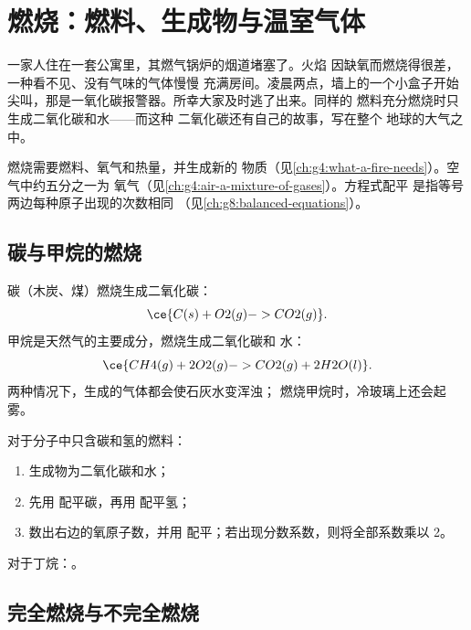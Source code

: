 \chapter{燃烧：燃料、生成物与温室气体}\label{ch:g8:combustion-and-fuels}

一家人住在一套公寓里，其燃气锅炉的烟道堵塞了。火焰
因缺氧而燃烧得很差，一种看不见、没有气味的气体慢慢
充满房间。凌晨两点，墙上的一个小盒子开始
尖叫，那是一氧化碳报警器。所幸大家及时逃了出来。同样的
燃料充分燃烧时只生成二氧化碳和水——而这种
二氧化碳还有自己的故事，写在整个
地球的大气之中。

\begin{recall}
燃烧需要燃料、氧气和热量，并生成新的
物质（见\cref{ch:g4:what-a-fire-needs}）。空气中约五分之一为
氧气（见\cref{ch:g4:air-a-mixture-of-gases}）。方程式配平
是指等号两边每种原子出现的次数相同
（见\cref{ch:g8:balanced-equations}）。
\end{recall}

\section{碳与甲烷的燃烧}

\begin{example}[两种燃烧]\label{ex:g8:combustion-and-fuels:two}
碳（木炭、煤）燃烧生成二氧化碳：
\[
  \ce{C(s) + O2(g) -> CO2(g)}.
\]
甲烷是天然气的主要成分，燃烧生成二氧化碳和
水：
\[
  \ce{CH4(g) + 2O2(g) -> CO2(g) + 2H2O(l)}.
\]
两种情况下，生成的气体都会使石灰水变浑浊；
燃烧甲烷时，冷玻璃上还会起雾。
\end{example}

\begin{method}\label{met:g8:combustion-and-fuels:write}
对于分子中只含碳和氢的燃料：
\begin{enumerate}
  \item 生成物为二氧化碳和水；
  \item 先用  配平碳，再用  配平氢；
       \item 数出右边的氧原子数，并用
         配平；若出现分数系数，则将全部系数乘以 2。
\end{enumerate}
对于丁烷：。
\end{method}

\section{完全燃烧与不完全燃烧}

